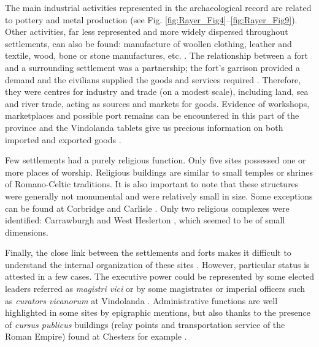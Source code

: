 The main industrial activities represented in the archaeological record are related to pottery and metal production (see Fig. \ref{fig:Rayer_Fig4}--\ref{fig:Rayer_Fig9}). Other activities, far less represented and more widely dispersed throughout settlements, can also be found: manufacture of woollen clothing, leather and textile, wood, bone or stone manufactures, etc. \parencites[148]{Clack_1982}[35]{Sommer_1984}[for the example of a workshop of Roman sculptures at Carlisle, see][90]{McCarthy_2002}. The relationship between a fort and a surrounding settlement was a partnership; the fort’s garrison provided a demand and the civilians supplied the goods and services required \parencite[85]{Bidwell_2007}. Therefore, they were centres for industry and trade (on a modest scale), including land, sea and river trade, acting as sources and markets for goods. Evidence of workshops, marketplaces and possible port remains can be encountered in this part of the province and the Vindolanda tablets give us precious information on both imported and exported goods \parencites{Bowman_2008}[69]{Osborn_2006}.

Few settlements had a purely religious function. Only five sites possessed one or more places of worship. Religious buildings are similar to small temples or shrines of Romano-Celtic traditions. It is also important to note that these structures were generally not monumental and were relatively small in size. Some exceptions can be found at Corbridge \parencite{Hodgson_2010} and Carlisle \parencite[83]{McCarthy_2002}. Only two religious complexes were identified: Carrawburgh \parencite{Breeze_1972} and West Heslerton \parencite{Halkon_2013}, which seemed to be of small dimensions.

Finally, the close link between the settlements and forts makes it difficult to understand the internal organization of these sites \parencite[22]{Sommer_1984}. However, particular status is attested in a few cases. The executive power could be represented by some elected leaders referred as \emph{magistri vici} \parencite[found at Old Carlisle;][899]{RIB_1965} or by some magistrates or imperial officers such as \emph{curators vicanorum} at Vindolanda \parencite[1700]{RIB_1965}. Administrative functions are well highlighted in some sites by epigraphic mentions, but also thanks to the presence of \emph{cursus publicus} buildings (relay points and transportation service of the Roman Empire) found at Chesters for example \parencite{Hodgson_2009}.


